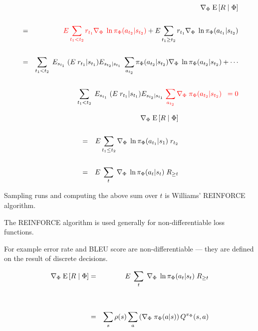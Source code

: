 {
\begin{eqnarray*}
 & &   \nabla_\Phi \;\mathrm{E}\left[R \;|\; \Phi\right] \\
  \\
    & = & {\color{red} E \sum_{t_1 < t_2} r_{t_1} \nabla_\Phi\;\ln \pi_\Phi(a_{t_2}|s_{t_2})}
  + E \sum_{t_1 \geq t_2} r_{t_1} \nabla_\Phi\;\ln \pi_\Phi(a_{t_1}|s_{t_2}) \\
  \\
  & = & \sum_{t_1 < t_2}\;E_{s_{t_1}}\;(E\; r_{t_1}|s_{t_1}) E_{s_{t_2}|s_{t_1}}\; \sum_{a_{t_2}} \pi_\Phi(a_{t_2}|s_{t_2})\nabla_\Phi\;\ln \pi_\Phi(a_{t_2}|s_{t_2}) + \cdots \\
  \\
  & & \sum_{t_1 < t_2}\;E_{s_{t_1}}\;(E\; r_{t_1}|s_{t_1}) E_{s_{t_2}|s_{t_1}}\; {\color{red} \sum_{a_{t_2}} \nabla_\Phi \;\pi_\Phi(a_{t_2}|s_{t_2}) \;\; = 0} 
\end{eqnarray*}

\begin{eqnarray*}
  & &   \nabla_\Phi \;\mathrm{E}\left[R \;|\; \Phi\right] \\
  \\
  & = & E \sum_{t_1 \leq t_2} \nabla_\Phi\;\ln \pi_\Phi(a_{t_1}|s_1) \;r_{t_2} \\
  \\
  & = & E\;\sum_t\; \nabla_\Phi\;\ln \pi_\Phi(a_t|s_t) \;R_{\geq t}
\end{eqnarray*}

\vfill
Sampling runs and computing the above sum over $t$ is Williams' REINFORCE algorithm.


The REINFORCE algorithm is used generally for non-differentiable loss functions.

\vfill
For example error rate and BLEU score are non-differentiable --- they are defined on the result of discrete decisions.

\vfill

\begin{eqnarray*}
  \nabla_\Phi \;\mathrm{E}\left[R \;|\; \Phi\right] & = & E\;\sum_t\; \nabla_\Phi\; \ln \pi_\Phi(a_t|s_t) \;R_{\geq t} \\
  \\
  \\
  & = & \sum_s \rho(s) \sum_a \left(\nabla_\Phi \;\pi_\Phi(a|s)\right) Q^{\pi_\Phi}(s,a)
\end{eqnarray*}

}
